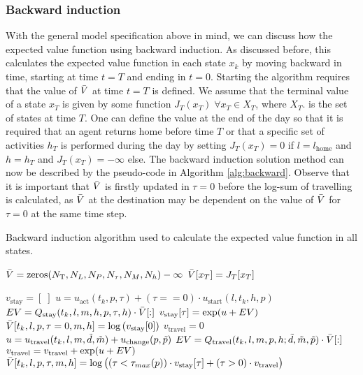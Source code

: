 \subsubsection{Backward induction}
With the general model specification above in mind, we can discuss how the expected value function using backward induction. As discussed before, this calculates the expected value function in each state $x_k$ by moving backward in time, starting at time $t=T$ and ending in $t=0$. Starting the algorithm requires that the value of $\bar{V}$ at time $t=T$ is defined. We assume that the terminal value of a state $x_T$ is given by some function $J_T(x_T) \;\forall x_T \in X_T$, where $X_T$. is the set of states at time $T$. One can define the value at the end of the day so that it is required that an agent returns home before time $T$ or that a specific set of activities $h_T$ is performed during the day by setting $J_T(x_T)=0$ if $l= l_\text{home}$ and $h= h_T$ and $J_T(x_T)=-\infty$ else. The backward induction solution method can now be described by the pseudo-code in Algorithm \ref{alg:backward}. Observe that it is important that $\bar{V}$ is firstly updated in $\tau=0$ before the log-sum of travelling is calculated, as $\bar{V}$ at the destination may be dependent on the value of $\bar{V}$ for $\tau=0$ at the same time step.

\begin{algorithm}
\caption{\label{alg:backward} Backward induction algorithm used to calculate the expected value function in all states.}
\begin{algorithmic}[1]
\State $\bar{V} = \text{zeros}(N_\text{T},N_L,N_P,N_\tau,N_M,N_h) -\infty $
\State $\bar{V}[x_T] = J_T[x_T]$
\EndFor

\State
{} 
\State
\State $v_\text{stay} = [\;]$ 
\State $u = u_\text{act}(t_k,p,\tau) + (\tau==0) \cdot  u_\text{start}(l,t_k,h,p)$
\State $EV = Q_{\text{stay}}{(t_k,l,m,h,p,\tau,h)} \cdot \bar{V}[:]$
\State $v_\text{stay}[\tau] = \exp(u + EV)$
\EndFor
\State $\bar{V}[t_k,l,p,\tau=0,m,h] = \log\left(v_\text{stay}[0]\right)$
\State 
\State $v_\text{travel} = 0$ 
\State $u= u_\text{travel}(t_k,l,m,\tilde{d},\tilde{m}) + u_\text{change}(p,\tilde{p})$
\State $EV = Q_{\text{travel}}(t_k,l,m,p,h;\tilde{d},\tilde{m},\tilde{p}) \cdot \bar{V}[:]$
\State $v_\text{travel} =v_\text{travel}+ \exp(u+EV)$
\EndFor
\State
{}
\State $\bar{V}[t_k,l,p,\tau,m,h]=\log\big((\tau < \tau_{max}(p))\cdot v_\text{stay}[\tau] + (\tau>0) \cdot v_\text{travel}\big)$
\EndFor
\State
\EndFor
\EndFor
\end{algorithmic}
\end{algorithm}

